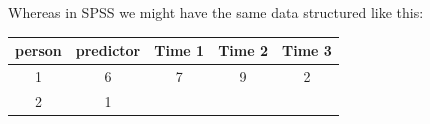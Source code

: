 \documentclass[]{article}
\newenvironment{Shaded}{\begin{snugshade}}{\end{snugshade}}
\newcommand{\StringTok}[1]{\textcolor[rgb]{0.31,0.60,0.02}{#1}}
\newcommand{\OperatorTok}[1]{\textcolor[rgb]{0.81,0.36,0.00}{\textbf{#1}}}
\newcommand{\NormalTok}[1]{#1}
\theoremstyle{definition}
\theoremstyle{definition}
\theoremstyle{definition}
\theoremstyle{remark}
\begin{document}
Whereas in SPSS we might have the same data structured like this:

\begin{Shaded}
\end{Shaded}

\begin{longtable}[]{@{}ccccc@{}}
\toprule
\begin{minipage}[b]{0.11\columnwidth}\centering\strut
person\strut
\end{minipage} & \begin{minipage}[b]{0.14\columnwidth}\centering\strut
predictor\strut
\end{minipage} & \begin{minipage}[b]{0.11\columnwidth}\centering\strut
Time 1\strut
\end{minipage} & \begin{minipage}[b]{0.11\columnwidth}\centering\strut
Time 2\strut
\end{minipage} & \begin{minipage}[b]{0.11\columnwidth}\centering\strut
Time 3\strut
\end{minipage}\tabularnewline
\midrule
\endhead
\begin{minipage}[t]{0.11\columnwidth}\centering\strut
1\strut
\end{minipage} & \begin{minipage}[t]{0.14\columnwidth}\centering\strut
6\strut
\end{minipage} & \begin{minipage}[t]{0.11\columnwidth}\centering\strut
7\strut
\end{minipage} & \begin{minipage}[t]{0.11\columnwidth}\centering\strut
9\strut
\end{minipage} & \begin{minipage}[t]{0.11\columnwidth}\centering\strut
2\strut
\end{minipage}\tabularnewline
\begin{minipage}[t]{0.11\columnwidth}\centering\strut
2\strut
\end{minipage} & \begin{minipage}[t]{0.14\columnwidth}\centering\strut
1\strut
\end{minipage} & \begin{minipage}[t]{0.11\columnwidth}\centering\strut

\end{minipage}
\end{longtable}
\end{document}
